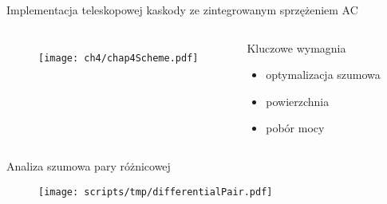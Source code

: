 \begin{frame}{Implementacja teleskopowej kaskody ze zintegrowanym sprzężeniem AC}
    \begin{columns}

        \begin{figure}[H]
            \texttt{[image: ch4/chap4Scheme.pdf]} 
        \end{figure}



        \begin{block}{Kluczowe wymagnia}
        \begin{itemize}
            \item optymalizacja szumowa
            \item powierzchnia
            \item pobór mocy
        \end{itemize}
            \end{block}



    \end{columns}   
 \end{frame}



\begin{frame}{Analiza szumowa pary różnicowej}
    \begin{figure}[H]
        \centering
        \texttt{[image: scripts/tmp/differentialPair.pdf]}  
    \end{figure}

\end{frame}



